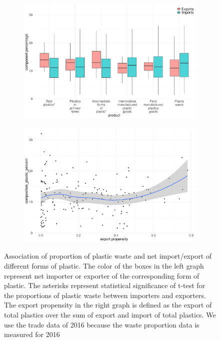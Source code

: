 \documentclass[dvipsnames]{article}
\begin{document}
\begin{figure}[htbp]
	\centering
	\begin{subfigure}{0.49\textwidth}
		\centering
		\includegraphics[width=\textwidth]{figures/boxplot_plastic_trade.pdf}	
		\label{subfig:boxplot_product}
	\end{subfigure}
	\begin{subfigure}{0.49\textwidth}
		\centering 
		\includegraphics[width=\textwidth]{figures/scatterplot_plastic_trade_Total plastics.pdf}
		\label{subfig:scatterplot_prodcut}
	\end{subfigure}
	\caption{\small Association of proportion of plastic waste and net import/export of different forms of plastic. The color of the boxes in the left graph represent net importer or exporter of the corresponding form of plastic. The asterisks represent statistical significance of t-test for the proportions of plastic waste between importers and exporters. The export propensity in the right graph is defined as the export of total plastics over the sum of export and import of total plastics. We use the trade data of 2016 because the waste proportion data is measured for 2016}
	\label{fig:a1}
\end{figure}
\end{document}
